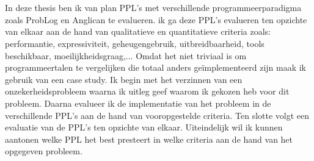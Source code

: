 \documentclass[12pt,a4paper,oneside]{book}
\begin{document}
\\\\
In deze thesis ben ik van plan PPL’s met verschillende programmeerparadigma zoals ProbLog en Anglican te evalueren. ik ga deze PPL’s evalueren ten opzichte van elkaar aan de hand van qualitatieve en quantitatieve criteria zoals: performantie, expressiviteit, geheugengebruik, uitbreidbaarheid, tools beschikbaar, moeilijkheidsgraag,... Omdat het niet triviaal is om programmeertalen te vergelijken die totaal anders geïmplementeerd zijn maak ik gebruik van een case study. Ik begin met het verzinnen van een onzekerheidsprobleem waarna ik uitleg geef waarom ik gekozen heb voor dit probleem. Daarna evalueer ik de implementatie van het probleem in de verschillende PPL’s aan de hand van vooropgestelde criteria. Ten slotte volgt een evaluatie van de PPL’s ten opzichte van elkaar. Uiteindelijk wil ik kunnen aantonen welke PPL het best presteert in welke criteria aan de hand van het opgegeven probleem.
\end{document}
